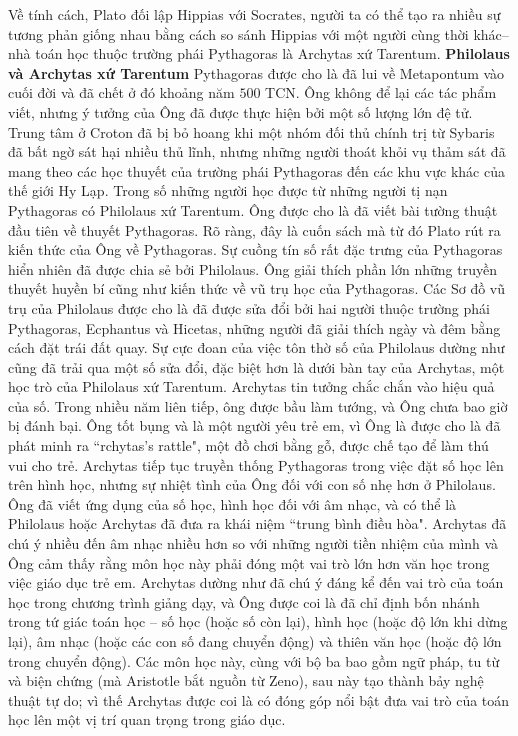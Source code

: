 \begin{multicols}{2}
	\vskip 0.1cm
	Về tính cách, Plato đối lập Hippias với Socrates, người ta có thể tạo ra nhiều sự tương phản giống nhau bằng cách so sánh Hippias với một người cùng thời khác--nhà toán học thuộc trường phái Pythagoras là Archytas xứ Tarentum.
	\vskip 0.1cm
	\textbf{\color{lichsutoanhoc}Philolaus và Archytas xứ Tarentum}
	\vskip 0.1cm  
	Pythagoras được cho là đã lui về Metapontum vào cuối đời và đã chết ở đó khoảng năm $500$ TCN.  Ông không để lại các tác phẩm viết, nhưng ý tưởng của Ông đã được thực hiện bởi một số lượng lớn đệ tử. Trung tâm ở Croton đã bị bỏ hoang khi một nhóm đối thủ chính trị từ Sybaris đã bất ngờ sát hại nhiều thủ lĩnh, nhưng những người thoát khỏi vụ thảm sát đã mang theo các học thuyết của trường phái Pythagoras đến các khu vực khác của thế giới Hy Lạp. Trong số những người học được từ những người tị nạn Pythagoras có Philolaus xứ Tarentum. Ông được cho là đã viết bài tường thuật đầu tiên về thuyết Pythagoras.  Rõ ràng, đây là cuốn sách mà từ đó Plato rút ra kiến thức của Ông về Pythagoras.  
	\vskip 0.1cm
	Sự cuồng tín số rất đặc trưng của Pythagoras hiển nhiên đã được chia sẻ bởi Philolaus. Ông giải thích phần lớn những truyền thuyết huyền bí cũng như kiến thức về vũ trụ học của Pythagoras. Các Sơ đồ vũ trụ của Philolaus được cho là đã được sửa đổi bởi hai người thuộc trường phái Pythagoras, Ecphantus và Hicetas, những người đã giải thích ngày và đêm bằng cách đặt trái đất quay.  
	\vskip 0.1cm
	Sự cực đoan của việc tôn thờ số của Philolaus dường như cũng đã trải qua một số sửa đổi, đặc biệt hơn là dưới bàn tay của Archytas, một học trò của Philolaus xứ Tarentum. 
	\vskip 0.1cm
	Archytas tin tưởng chắc chắn vào hiệu quả của số. Trong nhiều năm liên tiếp, ông được bầu làm tướng, và Ông chưa bao giờ bị đánh bại. Ông tốt bụng và là một người yêu trẻ em, vì Ông là được cho là đã phát minh ra ``rchytas's rattle", một đồ chơi bằng gỗ, được chế tạo để làm thú vui cho trẻ. Archytas tiếp tục truyền thống Pythagoras trong việc đặt số học lên trên hình học, nhưng sự nhiệt tình của Ông đối với con số nhẹ hơn ở Philolaus.  Ông đã viết ứng dụng của số học, hình học đối với âm nhạc, và có thể là Philolaus hoặc Archytas đã đưa ra khái niệm ``trung bình điều hòa". 
	\vskip 0.1cm
	Archytas đã chú ý nhiều đến âm nhạc nhiều hơn so với những người tiền nhiệm của mình và Ông cảm thấy rằng môn học này phải đóng một vai trò lớn hơn văn học trong việc giáo dục trẻ em. Archytas dường như đã chú ý đáng kể đến vai trò của toán học trong chương trình giảng dạy, và Ông được coi là đã chỉ định bốn nhánh trong tứ giác toán học -- số học (hoặc số còn lại), hình học (hoặc độ lớn khi dừng lại), âm nhạc (hoặc các con số đang chuyển động) và thiên văn học (hoặc độ lớn trong chuyển động). Các môn học này, cùng với bộ ba bao gồm ngữ pháp, tu từ và biện chứng (mà Aristotle bắt nguồn từ Zeno), sau này tạo thành bảy nghệ thuật tự do; vì thế Archytas được coi là có đóng góp nổi bật đưa vai trò của toán học lên một vị trí quan trọng trong giáo dục. 

\end{multicols}
